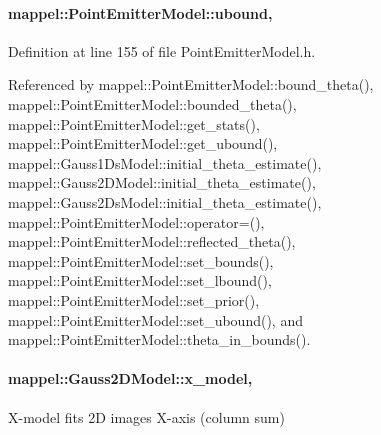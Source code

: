 \paragraph[{\texorpdfstring{ubound}{ubound}}]{ mappel\+::\+Point\+Emitter\+Model\+::ubound\hspace{0.3cm}{\ttfamily [protected]}, {\ttfamily [inherited]}}\hypertarget{classmappel_1_1PointEmitterModel_a35b883e84b6a2e0093bdf482c623beef}{}\label{classmappel_1_1PointEmitterModel_a35b883e84b6a2e0093bdf482c623beef}


Definition at line 155 of file Point\+Emitter\+Model.\+h.



Referenced by mappel\+::\+Point\+Emitter\+Model\+::bound\+\_\+theta(), mappel\+::\+Point\+Emitter\+Model\+::bounded\+\_\+theta(), mappel\+::\+Point\+Emitter\+Model\+::get\+\_\+stats(), mappel\+::\+Point\+Emitter\+Model\+::get\+\_\+ubound(), mappel\+::\+Gauss1\+Ds\+Model\+::initial\+\_\+theta\+\_\+estimate(), mappel\+::\+Gauss2\+D\+Model\+::initial\+\_\+theta\+\_\+estimate(), mappel\+::\+Gauss2\+Ds\+Model\+::initial\+\_\+theta\+\_\+estimate(), mappel\+::\+Point\+Emitter\+Model\+::operator=(), mappel\+::\+Point\+Emitter\+Model\+::reflected\+\_\+theta(), mappel\+::\+Point\+Emitter\+Model\+::set\+\_\+bounds(), mappel\+::\+Point\+Emitter\+Model\+::set\+\_\+lbound(), mappel\+::\+Point\+Emitter\+Model\+::set\+\_\+prior(), mappel\+::\+Point\+Emitter\+Model\+::set\+\_\+ubound(), and mappel\+::\+Point\+Emitter\+Model\+::theta\+\_\+in\+\_\+bounds().

\paragraph[{\texorpdfstring{x\+\_\+model}{x_model}}]{ mappel\+::\+Gauss2\+D\+Model\+::x\+\_\+model\hspace{0.3cm}{\ttfamily [protected]}, {\ttfamily [inherited]}}\hypertarget{classmappel_1_1Gauss2DModel_a2ed99bc290decb31ad1f6b7d106aad38}{}\label{classmappel_1_1Gauss2DModel_a2ed99bc290decb31ad1f6b7d106aad38}
X-\/model fits 2D images X-\/axis (column sum) 

